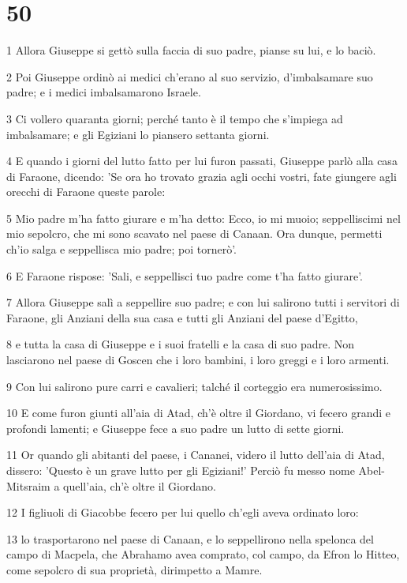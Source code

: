 \chapter{50}

\par 1 Allora Giuseppe si gettò sulla faccia di suo padre, pianse su lui, e lo baciò.
\par 2 Poi Giuseppe ordinò ai medici ch'erano al suo servizio, d'imbalsamare suo padre; e i medici imbalsamarono Israele.
\par 3 Ci vollero quaranta giorni; perché tanto è il tempo che s'impiega ad imbalsamare; e gli Egiziani lo piansero settanta giorni.
\par 4 E quando i giorni del lutto fatto per lui furon passati, Giuseppe parlò alla casa di Faraone, dicendo: 'Se ora ho trovato grazia agli occhi vostri, fate giungere agli orecchi di Faraone queste parole:
\par 5 Mio padre m'ha fatto giurare e m'ha detto: Ecco, io mi muoio; seppelliscimi nel mio sepolcro, che mi sono scavato nel paese di Canaan. Ora dunque, permetti ch'io salga e seppellisca mio padre; poi tornerò'.
\par 6 E Faraone rispose: 'Sali, e seppellisci tuo padre come t'ha fatto giurare'.
\par 7 Allora Giuseppe salì a seppellire suo padre; e con lui salirono tutti i servitori di Faraone, gli Anziani della sua casa e tutti gli Anziani del paese d'Egitto,
\par 8 e tutta la casa di Giuseppe e i suoi fratelli e la casa di suo padre. Non lasciarono nel paese di Goscen che i loro bambini, i loro greggi e i loro armenti.
\par 9 Con lui salirono pure carri e cavalieri; talché il corteggio era numerosissimo.
\par 10 E come furon giunti all'aia di Atad, ch'è oltre il Giordano, vi fecero grandi e profondi lamenti; e Giuseppe fece a suo padre un lutto di sette giorni.
\par 11 Or quando gli abitanti del paese, i Cananei, videro il lutto dell'aia di Atad, dissero: 'Questo è un grave lutto per gli Egiziani!' Perciò fu messo nome Abel-Mitsraim a quell'aia, ch'è oltre il Giordano.
\par 12 I figliuoli di Giacobbe fecero per lui quello ch'egli aveva ordinato loro:
\par 13 lo trasportarono nel paese di Canaan, e lo seppellirono nella spelonca del campo di Macpela, che Abrahamo avea comprato, col campo, da Efron lo Hitteo, come sepolcro di sua proprietà, dirimpetto a Mamre.
